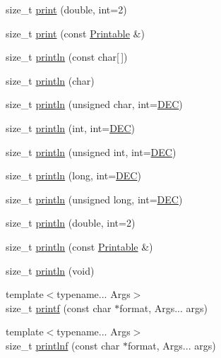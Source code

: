 \begin{DoxyCompactItemize}
\item 
size\+\_\+t \hyperlink{class_print_ae8b4c025786c820afe0a90aeea01c9c5}{print} (double, int=2)
\item 
size\+\_\+t \hyperlink{class_print_a901b0f06ae34aab31b8fbb4298f0596e}{print} (const \hyperlink{class_printable}{Printable} \&)
\item 
size\+\_\+t \hyperlink{class_print_ad337ce3f7977411b7d34d47a51e5737e}{println} (const char\mbox{[}$\,$\mbox{]})
\item 
size\+\_\+t \hyperlink{class_print_a554896a71162f967b5794401239d7a01}{println} (char)
\item 
size\+\_\+t \hyperlink{class_print_ac9afe80f50f0118d735295aec7727e50}{println} (unsigned char, int=\hyperlink{docs_2src_2spark__wiring__print_8h_a26e216c38cffa0a9965fa7933ba558b1}{D\+EC})
\item 
size\+\_\+t \hyperlink{class_print_a738c88471cfb8eac7c8a804699971413}{println} (int, int=\hyperlink{docs_2src_2spark__wiring__print_8h_a26e216c38cffa0a9965fa7933ba558b1}{D\+EC})
\item 
size\+\_\+t \hyperlink{class_print_ac87eed1fcb78641169ba2244278c899e}{println} (unsigned int, int=\hyperlink{docs_2src_2spark__wiring__print_8h_a26e216c38cffa0a9965fa7933ba558b1}{D\+EC})
\item 
size\+\_\+t \hyperlink{class_print_a833fbec3ceba92e3ec95f51e026e4569}{println} (long, int=\hyperlink{docs_2src_2spark__wiring__print_8h_a26e216c38cffa0a9965fa7933ba558b1}{D\+EC})
\item 
size\+\_\+t \hyperlink{class_print_aebee3c33ee5d8f10b6f378d5273742d0}{println} (unsigned long, int=\hyperlink{docs_2src_2spark__wiring__print_8h_a26e216c38cffa0a9965fa7933ba558b1}{D\+EC})
\item 
size\+\_\+t \hyperlink{class_print_a56e976b079361b6021ef7c2bedb397a2}{println} (double, int=2)
\item 
size\+\_\+t \hyperlink{class_print_a20f9e104153b62e720c9b4c348b44f00}{println} (const \hyperlink{class_printable}{Printable} \&)
\item 
size\+\_\+t \hyperlink{class_print_a169b128f9e22f0c15883768f580541a2}{println} (void)
\item 
{\footnotesize template$<$typename... Args$>$ }\\size\+\_\+t \hyperlink{class_print_a08a461c9fee5fd8f5795d6e9f61e3d5b}{printf} (const char $\ast$format, Args... args)
\item 
{\footnotesize template$<$typename... Args$>$ }\\size\+\_\+t \hyperlink{class_print_afa41aa5211c54b7b4d79b9286880c337}{printlnf} (const char $\ast$format, Args... args)

\end{DoxyCompactItemize}
